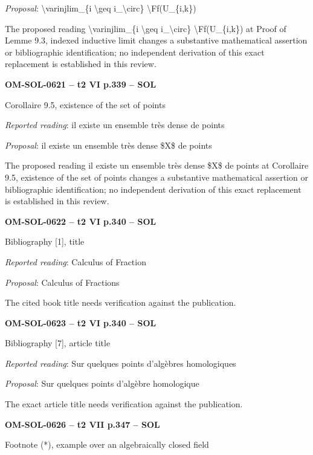 \emph{Proposal}: \textbackslash{}varinjlim\_\{i \textbackslash{}geq i\_\textbackslash{}circ\} \textbackslash{}Ff(U\_\{i,k\})\par
The proposed reading \textbackslash{}varinjlim\_\{i \textbackslash{}geq i\_\textbackslash{}circ\} \textbackslash{}Ff(U\_\{i,k\}) at Proof of Lemme 9.3, indexed inductive limit changes a substantive mathematical assertion or bibliographic identification; no independent derivation of this exact replacement is established in this review.\par
\par\noindent\textbf{OM-SOL-0621 -- t2 VI p.339 -- SOL}\par
Corollaire 9.5, existence of the set of points\par
\emph{Reported reading}: il existe un ensemble très dense de points\par
\emph{Proposal}: il existe un ensemble très dense \$X\$ de points\par
The proposed reading il existe un ensemble très dense \$X\$ de points at Corollaire 9.5, existence of the set of points changes a substantive mathematical assertion or bibliographic identification; no independent derivation of this exact replacement is established in this review.\par
\par\noindent\textbf{OM-SOL-0622 -- t2 VI p.340 -- SOL}\par
Bibliography [1], title\par
\emph{Reported reading}: Calculus of Fraction\par
\emph{Proposal}: Calculus of Fractions\par
The cited book title needs verification against the publication.\par
\par\noindent\textbf{OM-SOL-0623 -- t2 VI p.340 -- SOL}\par
Bibliography [7], article title\par
\emph{Reported reading}: Sur quelques points d'algèbres homologiques\par
\emph{Proposal}: Sur quelques points d'algèbre homologique\par
The exact article title needs verification against the publication.\par
\par\noindent\textbf{OM-SOL-0626 -- t2 VII p.347 -- SOL}\par
Footnote (*), example over an algebraically closed field\par
